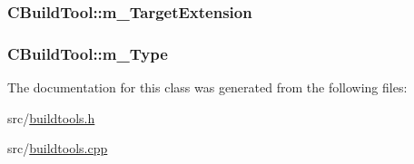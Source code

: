 \hypertarget{classCBuildTool_a358fae486209c5c9ee63d65e832bf815}{
\subsubsection[{m\-\_\-\-Target\-Extension}]{ C\-Build\-Tool\-::m\-\_\-\-Target\-Extension\hspace{0.3cm}{\ttfamily [protected]}}}\label{classCBuildTool_a358fae486209c5c9ee63d65e832bf815}
\hypertarget{classCBuildTool_aca6ef29a8035174232c7b303ec5c51b1}{
\subsubsection[{m\-\_\-\-Type}]{ C\-Build\-Tool\-::m\-\_\-\-Type\hspace{0.3cm}{\ttfamily [protected]}}}\label{classCBuildTool_aca6ef29a8035174232c7b303ec5c51b1}


The documentation for this class was generated from the following files\-:\begin{DoxyCompactItemize}
\item 
src/\hyperlink{buildtools_8h}{buildtools.\-h}\item 
src/\hyperlink{buildtools_8cpp}{buildtools.\-cpp}\end{DoxyCompactItemize}
